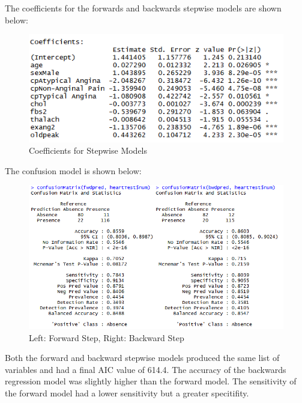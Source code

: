 \documentclass[12pt]{article}
\begin{document}
The coefficients for the forwards and backwards stepwise models are shown below: 
\begin{figure}[h!]
\begin{center}
\includegraphics[scale=.75]{coefstepwise}
\caption{Coefficients for Stepwise Models}
\end{center}
\end{figure}

\pagebreak
The confusion model is shown below: 

\begin{figure}[h!]
\begin{center}
\includegraphics[scale=.75]{confusionmatrix_step}
\caption{Left: Forward Step, Right: Backward Step}
\end{center}
\end{figure}

Both the forward and backward stepwise models produced the same list of variables and had a final AIC value of 614.4. The accuracy of the backwards regression model was slightly higher than the forward model. The sensitivity of the forward model had a lower sensitivity but a greater specitifity. 
\end{document}
